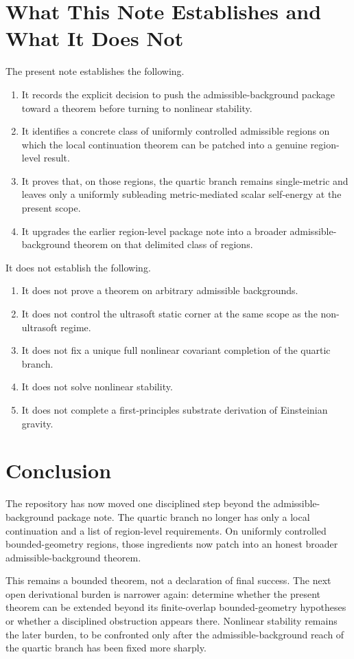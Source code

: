 \documentclass[11pt]{article}
\begin{document}
\section{What This Note Establishes and What It Does Not}

The present note establishes the following.
\begin{enumerate}
    \item It records the explicit decision to push the admissible-background package toward a theorem before turning to nonlinear stability.
    \item It identifies a concrete class of uniformly controlled admissible regions on which the local continuation theorem can be patched into a genuine region-level result.
    \item It proves that, on those regions, the quartic branch remains single-metric and leaves only a uniformly subleading metric-mediated scalar self-energy at the present scope.
    \item It upgrades the earlier region-level package note into a broader admissible-background theorem on that delimited class of regions.
\end{enumerate}

It does not establish the following.
\begin{enumerate}
    \item It does not prove a theorem on arbitrary admissible backgrounds.
    \item It does not control the ultrasoft static corner at the same scope as the non-ultrasoft regime.
    \item It does not fix a unique full nonlinear covariant completion of the quartic branch.
    \item It does not solve nonlinear stability.
    \item It does not complete a first-principles substrate derivation of Einsteinian gravity.
\end{enumerate}

\section{Conclusion}

The repository has now moved one disciplined step beyond the admissible-background package note. The quartic branch no longer has only a local continuation and a list of region-level requirements. On uniformly controlled bounded-geometry regions, those ingredients now patch into an honest broader admissible-background theorem.

This remains a bounded theorem, not a declaration of final success. The next open derivational burden is narrower again: determine whether the present theorem can be extended beyond its finite-overlap bounded-geometry hypotheses or whether a disciplined obstruction appears there. Nonlinear stability remains the later burden, to be confronted only after the admissible-background reach of the quartic branch has been fixed more sharply.
\end{document}
